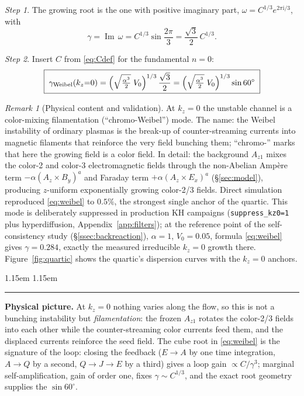 \documentclass[11pt,a4paper]{article}
\numberwithin{equation}{section}
\theoremstyle{remark}
\newtheorem{remark}[lemma]{Remark}
\newtheorem{step}{Step}[subsection]
\newenvironment{intuition}%
{\par\medskip\noindent
 \begin{list}{}{\leftmargin 1.15em \rightmargin 1.15em \listparindent 0pt
 \itemindent 0pt \parsep 2pt \topsep 2pt}\item\relax
 \small\textcolor{intu}{\rule[-0.6ex]{2.6pt}{2.4ex}}\hspace{0.55em}%
 \textcolor{intu}{\textbf{Physical picture.}}\hspace{0.5em}\ignorespaces}%
{\end{list}\medskip}
\newcommand{\Vo}{V_0}
\newcommand{\kz}{k_z}
\newcommand{\Az}{A_{z1}}
\newcommand{\ii}{\mathrm{i}}
\newcommand{\Imy}{\operatorname{Im}}
\begin{document}
\begin{step}
The growing root is the one with positive imaginary part,
$\omega=C^{1/3}e^{2\pi\ii/3}$, with
\begin{equation}
\gamma=\Imy\,\omega
=C^{1/3}\sin\frac{2\pi}{3}
=\frac{\sqrt3}{2}\,C^{1/3}.
\end{equation}
\end{step}

\begin{step}
Insert $C$ from \eqref{eq:Cdef} for the fundamental $n=0$:
\begin{equation}
\boxed{\;
\gamma_{\mathrm{Weibel}}(\kz{=}0)
=\Bigl(\sqrt{\tfrac{\alpha^3}{2}}\;\Vo\Bigr)^{1/3}\,
\frac{\sqrt3}{2}
=\Bigl(\sqrt{\tfrac{\alpha^3}{2}}\;\Vo\Bigr)^{1/3}\sin 60^\circ
\;}
\label{eq:weibel}
\end{equation}
\end{step}

\begin{remark}[Physical content and validation]
At $\kz=0$ the unstable channel is a color-mixing filamentation
(``chromo-Weibel'') mode. The name: the Weibel instability of ordinary
plasmas is the break-up of counter-streaming currents into magnetic
filaments that reinforce the very field bunching them;
``chromo-'' marks that here the growing field is a color field. In
detail: the background $\Az$ mixes the color-2 and
color-3 electromagnetic fields through the non-Abelian Amp\`ere term
$-\alpha(A_z\times B_y)^a$ and Faraday term $+\alpha(A_z\times E_x)^a$
(\S\ref{sec:model}), producing $z$-uniform exponentially growing color-2/3
fields. Direct simulation reproduced \eqref{eq:weibel} to $0.5\%$, the
strongest single anchor of the quartic. This mode is deliberately
suppressed in production KH campaigns (\texttt{suppress\_kz0=1} plus
hyperdiffusion, Appendix~\ref{app:filters}); at the reference point of the
self-consistency study (\S\ref{ssec:backreaction}), $\alpha=1$, $\Vo=0.05$,
formula \eqref{eq:weibel} gives $\gamma=0.284$, exactly the measured
irreducible $\kz=0$ growth there. Figure~\ref{fig:quartic} shows the
quartic's dispersion curves with the $\kz=0$ anchors.
\end{remark}

\begin{intuition}
At $\kz=0$ nothing varies along the flow, so this is not a bunching
instability but \emph{filamentation}: the frozen $\Az$ rotates the
color-2/3 fields into each other while the counter-streaming color
currents feed them, and the displaced currents reinforce the seed field.
The cube root in \eqref{eq:weibel} is the signature of the loop: closing
the feedback ($E\to A$ by one time integration, $A\to Q$ by a second,
$Q\to J\to E$ by a third) gives a loop gain $\propto C/\gamma^3$; marginal
self-amplification, gain of order one, fixes $\gamma\sim C^{1/3}$, and the
exact root geometry supplies the $\sin 60^\circ$.
\end{intuition}
\end{document}
